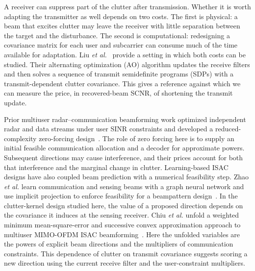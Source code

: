 \documentclass[journal]{IEEEtran}
\begin{document}
A receiver can suppress part of the clutter after transmission. Whether it is worth adapting the transmitter as well depends on two costs. The first is physical: a beam that excites clutter may leave the receiver with little separation between the target and the disturbance. The second is computational: redesigning a covariance matrix for each user and subcarrier can consume much of the time available for adaptation. Liu \emph{et al.}~\cite{liu2026clutter,liuCode} provide a setting in which both costs can be studied. Their alternating optimization (AO) algorithm updates the receive filters and then solves a sequence of transmit semidefinite programs (SDPs) with a transmit-dependent clutter covariance. This gives a reference against which we can measure the price, in recovered-beam SCNR, of shortening the transmit update.

Prior multiuser radar--communication beamforming work optimized independent radar and data streams under user SINR constraints and developed a reduced-complexity zero-forcing design~\cite{xiang2020}. The role of zero forcing here is to supply an initial feasible communication allocation and a decoder for approximate powers. Subsequent directions may cause interference, and their prices account for both that interference and the marginal change in clutter.
Learning-based ISAC designs have also coupled beam prediction with a numerical feasibility step. Zhao \emph{et al.} learn communication and sensing beams with a graph neural network and use implicit projection to enforce feasibility for a beampattern design~\cite{zhao}. In the clutter-kernel design studied here, the value of a proposed direction depends on the covariance it induces at the sensing receiver. Chiu \emph{et al.} unfold a weighted minimum mean-square-error and successive convex approximation approach to multiuser MIMO-OFDM ISAC beamforming~\cite{chiu2025mimoofdm}. Here the unfolded variables are the powers of explicit beam directions and the multipliers of communication constraints. This dependence of clutter on transmit covariance suggests scoring a new direction using the current receive filter and the user-constraint multipliers.
\end{document}

